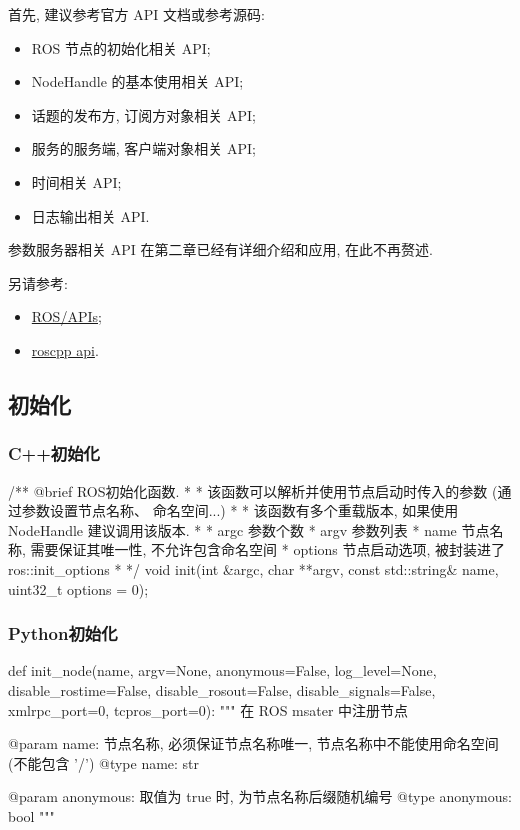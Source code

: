 \documentclass[openany, fontset=windowsold]{ctexbook}
\theoremstyle{kaiti}
\theoremstyle{normal}
\begin{document}
首先, 建议参考官方 API 文档或参考源码:

\begin{itemize}
  \item ROS 节点的初始化相关 API;
  \item NodeHandle 的基本使用相关 API;
  \item 话题的发布方, 订阅方对象相关 API;
  \item 服务的服务端, 客户端对象相关 API;
  \item 时间相关 API;
  \item 日志输出相关 API.
\end{itemize}

参数服务器相关 API 在第二章已经有详细介绍和应用, 在此不再赘述.

另请参考:

\begin{itemize}
  \item \href{http://wiki.ros.org/APIs}{ROS/APIs};
  \item \href{https://docs.ros.org/en/api/roscpp/html/}{roscpp api}.
\end{itemize}

\subsection{初始化}

\subsubsection{C++初始化}

\begin{cpp}
  /** @brief ROS初始化函数.
   *
   * 该函数可以解析并使用节点启动时传入的参数 (通过参数设置节点名称、 命名空间...) 
   *
   * 该函数有多个重载版本, 如果使用 NodeHandle 建议调用该版本.  
   *
   * \param argc 参数个数
   * \param argv 参数列表
   * \param name 节点名称, 需要保证其唯一性, 不允许包含命名空间
   * \param options 节点启动选项, 被封装进了ros::init_options
   *
   */
  void init(int &argc, char **argv, const std::string& name, uint32_t options = 0);
\end{cpp}

\subsubsection{Python初始化}

\begin{python}
  def init_node(name, argv=None, anonymous=False, log_level=None, disable_rostime=False, disable_rosout=False, disable_signals=False, xmlrpc_port=0, tcpros_port=0):
      """
      在 ROS msater 中注册节点

      @param name: 节点名称, 必须保证节点名称唯一, 节点名称中不能使用命名空间 (不能包含 '/')
      @type  name: str

      @param anonymous: 取值为 true 时, 为节点名称后缀随机编号
      @type anonymous: bool
      """
\end{python}
\end{document}
